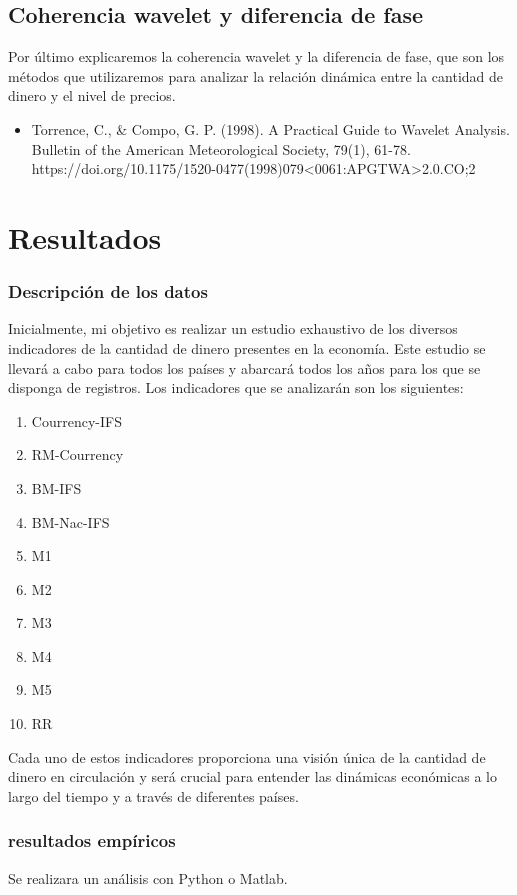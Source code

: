 \documentclass[a4paper,fleqn]{cas-sc}
\begin{document}
\subsection{Coherencia wavelet y diferencia de fase}
Por último explicaremos la coherencia wavelet y la diferencia de fase, que son los métodos que utilizaremos para analizar la relación dinámica entre la cantidad de dinero y el nivel de precios.

    \begin{itemize}
	\item Torrence, C., \& Compo, G. P. (1998). A Practical Guide to Wavelet Analysis. Bulletin of the American Meteorological Society, 79(1), 61-78. https://doi.org/10.1175/1520-0477(1998)079<0061:APGTWA>2.0.CO;2
    \end{itemize}

\section{Resultados}
\subsubsection{Descripción de los datos}
Inicialmente, mi objetivo es realizar un estudio exhaustivo de los diversos indicadores de la cantidad de dinero presentes en la economía. Este estudio se llevará a cabo para todos los países y abarcará todos los años para los que se disponga de registros. Los indicadores que se analizarán son los siguientes:
\begin{enumerate}
    \item Courrency-IFS
    \item RM-Courrency
    \item BM-IFS
    \item BM-Nac-IFS
    \item M1
    \item M2
    \item M3
    \item M4
    \item M5
    \item RR
\end{enumerate}
Cada uno de estos indicadores proporciona una visión única de la cantidad de dinero en circulación y será crucial para entender las dinámicas económicas a lo largo del tiempo y a través de diferentes países.

\subsubsection{resultados empíricos}
Se realizara un análisis con Python o Matlab.
\end{document}
